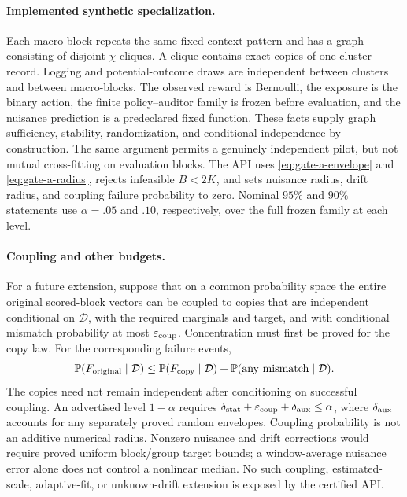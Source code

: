 \paragraph{Implemented synthetic specialization.}
Each macro-block repeats the same fixed context pattern and has a graph
consisting of disjoint $\chi$-cliques. A clique contains exact copies of
one cluster record. Logging and potential-outcome draws are independent
between clusters and between macro-blocks. The observed reward is
Bernoulli, the exposure is the binary action, the finite policy--auditor
family is frozen before evaluation, and the nuisance prediction is a
predeclared fixed function. These facts supply graph sufficiency,
stability, randomization, and conditional independence by construction.
The same argument permits a genuinely independent pilot, but not mutual
cross-fitting on evaluation blocks. The API uses
\cref{eq:gate-a-envelope} and \cref{eq:gate-a-radius}, rejects infeasible
$B<2K$, and sets nuisance radius, drift radius, and coupling failure
probability to zero. Nominal $95\%$ and $90\%$ statements use $\alpha=.05$
and $.10$, respectively, over the full frozen family at each level.

\paragraph{Coupling and other budgets.}
For a future extension, suppose that on a common probability space the
entire original scored-block vectors can be coupled to copies that are
independent conditional on $\mathcal D$, with the required marginals and
target, and with conditional mismatch probability at most
$\varepsilon_{\rm coup}$. Concentration must first be proved for the
copy law. For the corresponding failure events,
\[
 \mathbb{P}(F_{\rm original}\mid\mathcal D)
 \le \mathbb{P}(F_{\rm copy}\mid\mathcal D)
       +\mathbb{P}(\text{any mismatch}\mid\mathcal D).
\]
The copies need not remain independent after conditioning on successful
coupling. An advertised level $1-\alpha$ requires
$\delta_{\rm stat}+\varepsilon_{\rm coup}+\delta_{\rm aux}\le\alpha$,
where $\delta_{\rm aux}$ accounts for any separately proved random
envelopes. Coupling probability is not an additive numerical radius.
Nonzero nuisance and drift corrections would require proved uniform
block/group target bounds; a window-average nuisance error alone does
not control a nonlinear median. No such coupling, estimated-scale,
adaptive-fit, or unknown-drift extension is exposed by the certified API.

